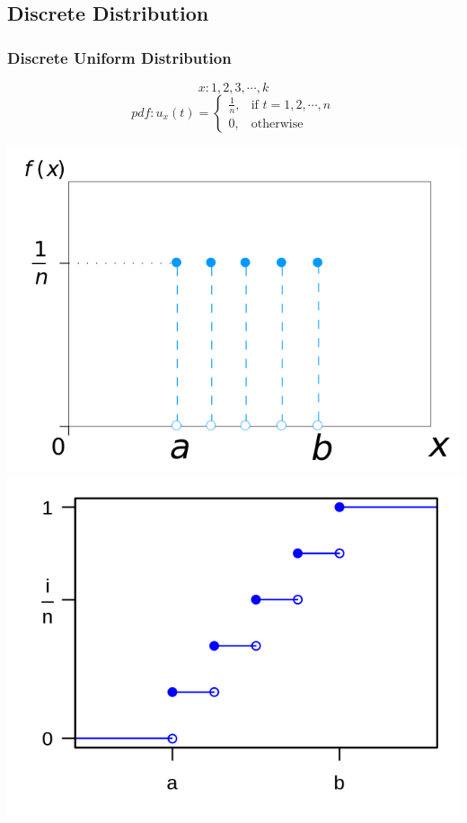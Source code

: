 \documentclass{article}
\begin{document}
    \subsection{Discrete Distribution}{
        \subsubsection{Discrete Uniform Distribution}{
            \[ x: 1,2,3, \cdots, k\]
            \[ pdf: u_x(t)= \begin{cases} 
                \frac{1}{n}, & \text{if } t=1, 2,  \cdots, n \\
                0, & \text{otherwise} 
            \end{cases}\]
            \begin{center}{
                \includegraphics[scale=0.25]{Dis_Uniform_distribution_pdf.png}\includegraphics[scale=0.25]{Dis_Uniform_distribution_CDF.png}
            }
            \end{center}
        }
}
\end{document}
